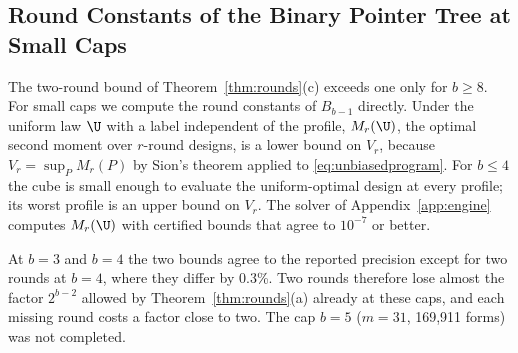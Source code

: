 \subsection{Round Constants of the Binary Pointer Tree at Small Caps}\label{app:pointerexact}
The two-round bound of Theorem~\ref{thm:rounds}(c) exceeds one only for $b\ge8$. For small caps we compute the round constants of $B_{b-1}$ directly. Under the uniform law $\U$ with a label independent of the profile, $M_r(\U)$, the optimal second moment over $r$-round designs, is a lower bound on $V_r$, because $V_r=\sup_PM_r(P)$ by Sion's theorem applied to \eqref{eq:unbiasedprogram}. For $b\le4$ the cube is small enough to evaluate the uniform-optimal design at every profile; its worst profile is an upper bound on $V_r$. The solver of Appendix~\ref{app:engine} computes $M_r(\U)$ with certified bounds that agree to $10^{-7}$ or better.

At $b=3$ and $b=4$ the two bounds agree to the reported precision except for two rounds at $b=4$, where they differ by 0.3\%. Two rounds therefore lose almost the factor $2^{b-2}$ allowed by Theorem~\ref{thm:rounds}(a) already at these caps, and each missing round costs a factor close to two. The cap $b=5$ ($m=31$, 169,911 forms) was not completed.
